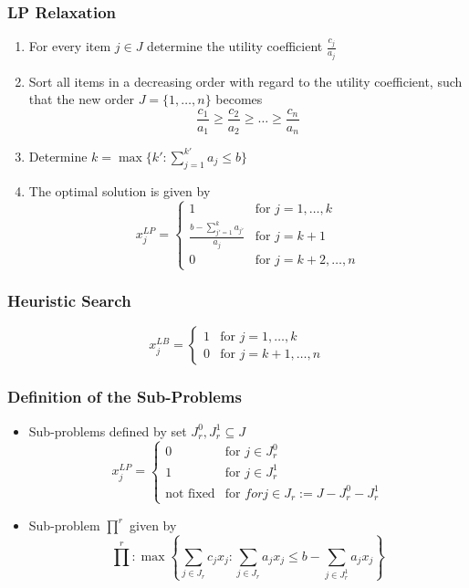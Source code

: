 \documentclass[11pt]{article}
\begin{document}
\subsubsection{LP Relaxation}
\begin{enumerate}[label=\roman*.]
	\item For every item  $j\in J$ determine the utility coefficient $\frac{c_j}{a_j}$
	\item Sort all items in a decreasing order with regard to the utility coefficient, such that the new order $J = \{1,\dots,n\}$ becomes
	\begin{equation*}
		\frac{c_1}{a_1}\geq\frac{c_2}{a_2}\geq\dots\geq\frac{c_n}{a_n}
	\end{equation*}
	\item Determine $k = \max\{k' : \sum_{j=1}^{k'}a_j \leq b\}$
	\item The optimal solution is given by
	\begin{equation*}
		x_j^{LP} = \left\{ \begin{matrix}
		1 & \text{for } j = 1,\dots, k\\
		\frac{b-\sum_{j' = 1}^{k} a_{j'}}{a_j} & \text{for } j = k + 1\\
		0 & \text{for } j = k + 2,\dots, n
		\end{matrix} \right.
	\end{equation*}
\end{enumerate}

\subsubsection{Heuristic Search}
	\begin{equation*}
		x_j^{LB} = \left\{ \begin{matrix}
			1 & \text{for } j = 1,\dots, k\\
			0 & \text{for } j = k + 1,\dots, n
		\end{matrix} \right.
\end{equation*}

\subsubsection{Definition of the Sub-Problems}
\begin{itemize}
	\item Sub-problems defined by set $J_r^0,J_r^1\subseteq J$
		\begin{equation*}
			x_j^{LP} = \left\{ \begin{matrix}
				0 & \text{for } j \in J_r^0\\
				1 & \text{for } j \in J_r^1\\
				\text{not fixed} & \text{for } for j\in J_r := J - J_r^0 - J_r^1
			\end{matrix} \right.
	\end{equation*}
	\item Sub-problem ${\prod}^r$ given by
	\begin{equation*}
		{\prod}^r : \max \left\{ \sum_{j\in J_r}c_j x_j : \sum_{j\in J_r}a_j x_j  \leq b - \sum_{j\in J_r^1}a_j x_j  \right\}
	\end{equation*}
\end{itemize}
\end{document}
